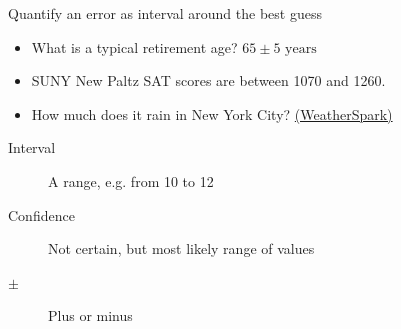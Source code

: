 \documentclass[onlytextwidth]{beamer}
\begin{document}
\begin{frame}{Quantify an error as interval around the best guess}
   \begin{itemize}
    \item What is a typical retirement age? $65 \pm 5 \text{ years}$
    \item SUNY New Paltz SAT scores are between 1070 and 1260.
    \item How much does it rain in New York City? 
        \href{https://weatherspark.com/y/23912/Average-Weather-in-New-York-City-New-York-United-States-Year-Round\#Figures-Rainfall}{(WeatherSpark)}
   \end{itemize}
        \begin{description}
            \item[Interval] A range, e.g. from 10 to 12
            \item[Confidence] Not certain, but most likely range of values
            \item[$\pm$] Plus or minus
        \end{description}
    \end{frame}
    
\end{document}
